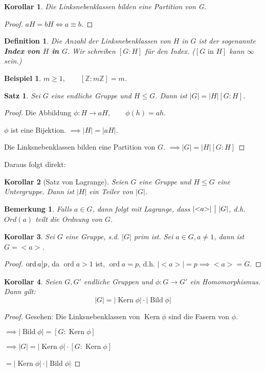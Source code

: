 \documentclass{article}
\theoremstyle{plain}
\newtheorem{definition}{Definition}
\newtheorem{theorem}{Satz}
\newtheorem{corollary}{Korollar}
\newtheorem{beispiel}{Beispiel}
\newtheorem{bemerkung}{Bemerkung}
\renewcommand{\ker}{\mathop{\mathrm{Kern}}}
\newcommand{\bild}{\mathop{\mathrm{Bild}}}
\newcommand{\defn}[1]{\textbf{#1}}
\newcommand{\Z}{\mathbb{Z}}
\newcommand{\ug}{\leq}
\newcommand{\ord}{\mathop{\text{ord}}}
\newcommand{\teilt}{\big{|}}
\newcommand{\zykl}[1]{{<}{#1}{>}}
\begin{document}
\begin{corollary}
    Die Linksnebenklassen bilden eine Partition von G.
\end{corollary}
\begin{proof}
    $aH=bH\Leftrightarrow a\equiv b$.    
\end{proof}

\begin{definition}
    Die Anzahl der Linksnebenklassen von $H$ in $G$ ist der sogenannte \defn{Index von $H$ in $G$}. Wir schreiben $[G:H]$ für den Index. ($[G\text{ in }H]$ kann $\infty$ sein.)
\end{definition}

\begin{beispiel}
    $m\geq 1,\qquad [\Z:m\Z]=m$.
\end{beispiel}

\begin{theorem}
    Sei $G$ eine endliche Gruppe und $H\ug G$. Dann ist $|G|=|H|[G:H]$.
\end{theorem}
\begin{proof}
    Die Abbildung $\phi\colon H\to aH, \qquad \phi(h)=ah$. 
    
    $\phi$ ist eine Bijektion. $\implies |H|=|aH|$.

    Die Linksnebenklassen bilden eine Partition von $G$. $\implies |G|=|H|[G:H]$
\end{proof}
Daraus folgt direkt:
\begin{corollary}[Satz von Lagrange]\label{stz:lagrange}
    Seien $G$ eine Gruppe und $H\ug G$ eine Untergruppe. Dann ist $|H|$ ein Teiler von $|G|$.
\end{corollary}
\begin{bemerkung}
    Falls $a\in G$, dann folgt mit Lagrange, dass $|\zykl{a}|\ \teilt\ |G|$, d.h. $Ord(a)$ teilt die Ordnung von $G$.
\end{bemerkung}
\begin{corollary}
    Sei $G$ eine Gruppe, s.d. $|G|$ prim ist. Sei $a\in G, a\neq 1$, dann ist $G=\zykl{a}$. 
\end{corollary}
\begin{proof}
    $\ord a \teilt p$, da $\ord a > 1$ ist, $\ord a =p$, d.h. $|\zykl{a}|=p \implies \zykl{a}=G.$
\end{proof}

\begin{corollary}\label{cor:ordnung}
    Seien $G, G'$ endliche Gruppen und $\phi\colon G\to G'$ ein Homomorphismus. Dann gilt:
    $$|G|=|\ker \phi|\cdot|\bild \phi|$$
\end{corollary}
\begin{proof}
    Gesehen: Die Linksnebenklassen von $\ker \phi$ sind die Fasern von $\phi$. 
    
    $\implies |\bild\phi|=[G:\ker\phi]$
    
    $\implies |G| = |\ker\phi|\cdot[G:\ker\phi]$
    
    \qquad $=|\ker\phi|\cdot|\bild\phi|$
\end{proof}
\end{document}
